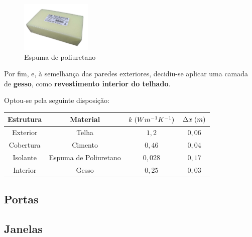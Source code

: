 \documentclass[12pt, a4paper]{article}
\begin{document}
\begin{figure}[htpb]
	\centering
	\includegraphics[width=0.3\textwidth]{espuma_poliuretano.jpg}
	\caption{Espuma de poliuretano}\label{fig:poliuretano}
\end{figure}

Por fim, e, à semelhança das paredes exteriores, decidiu-se aplicar uma camada de \textbf{gesso}, como
\textbf{revestimento interior do telhado}.

Optou-se pela seguinte disposição:

\begin{center}
	\begin{tabular}{||c c c c||}
		\hline
		Estrutura & Material              & $k \hspace{1mm} (Wm^{-1}K^{-1})$ & $\Delta x \hspace{1mm} (m)$ \\ [0.5ex]
		\hline\hline
		Exterior  & Telha                 & $1,2$                            & $0,06$                      \\
		\hline
		Cobertura & Cimento               & $0,46$                           & $0,04$                      \\
		\hline
		Isolante  & Espuma de Poliuretano & $0,028$                          & $0,17$                      \\
		\hline
		Interior  & Gesso                 & $0,25$                           & $0,03$                      \\
		\hline
	\end{tabular}
\end{center}



\subsection{Portas}\label{sub:Portas}



\subsection{Janelas}\label{sub:Janelas}
\end{document}
